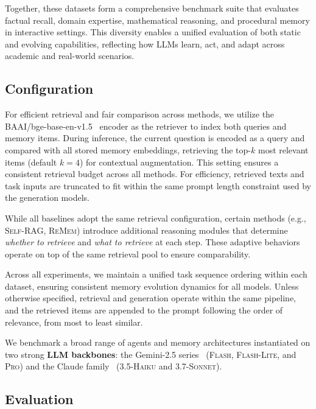 Together, these datasets form a comprehensive benchmark suite that evaluates factual recall, domain expertise, mathematical reasoning, and procedural memory in interactive settings. This diversity enables a unified evaluation of both static and evolving capabilities, reflecting how LLMs learn, act, and adapt across academic and real-world scenarios.

\subsection{Configuration}

For efficient retrieval and fair comparison across methods, we utilize the BAAI/bge-base-en-v1.5~\citep{bge_m3} encoder as the retriever to index both queries and memory items.
During inference, the current question is encoded as a query and compared with all stored memory embeddings, retrieving the top-$k$ most relevant items (default $k=4$) for contextual augmentation.
This setting ensures a consistent retrieval budget across all methods.
For efficiency, retrieved texts and task inputs are truncated to fit within the same prompt length constraint used by the generation models.

While all baselines adopt the same retrieval configuration, certain methods (e.g., \textsc{Self-RAG}, \textsc{ReMem}) introduce additional reasoning modules that determine \emph{whether to retrieve} and \emph{what to retrieve} at each step. These adaptive behaviors operate on top of the same retrieval pool to ensure comparability.

Across all experiments, we maintain a unified task sequence ordering within each dataset, ensuring consistent memory evolution dynamics for all models. Unless otherwise specified, retrieval and generation operate within the same pipeline, and the retrieved items are appended to the prompt following the order of relevance, from most to least similar.

We benchmark a broad range of agents and memory architectures instantiated on two strong \textbf{LLM backbones}: the Gemini-2.5 series~\citep{comanici2025gemini} (\textsc{Flash}, \textsc{Flash-Lite}, and \textsc{Pro}) and the Claude family~\citep{anthropic_claude4_2025} (\textsc{3.5-Haiku} and \textsc{3.7-Sonnet}).

\subsection{Evaluation}

